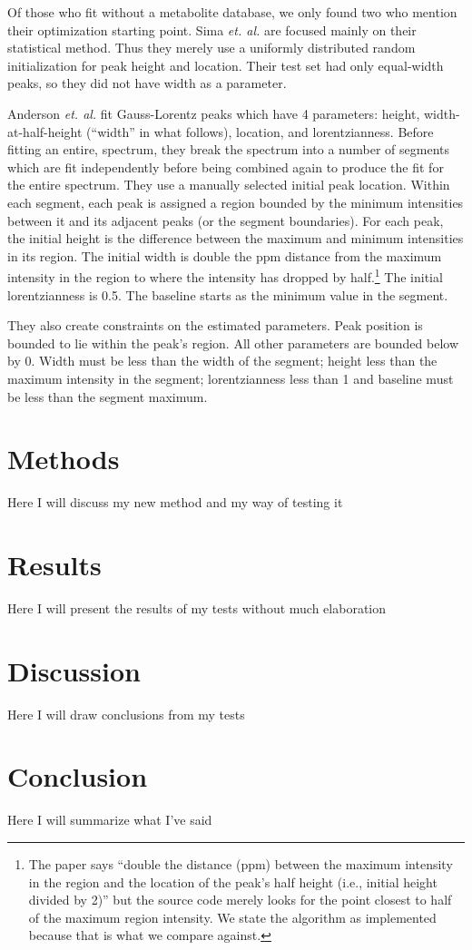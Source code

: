 \documentclass[10pt,letterpaper]{article}
\begin{document}
Of those who fit without a metabolite database, we only found two who mention their optimization starting point.
Sima \textit{et. al.}\cite{Sima2006} are focused mainly on their statistical method. Thus they merely use a 
uniformly distributed random initialization for peak height and location. Their test set had only equal-width
peaks, so they did not have width as a parameter.

Anderson \textit{et. al.}\cite{Anderson2012} fit Gauss-Lorentz peaks which have 4 parameters: height, 
width-at-half-height (``width'' in what follows), location, and lorentzianness. Before fitting an entire, 
spectrum, they break the spectrum into a number of segments which are fit independently before being
combined again to produce the fit for the entire spectrum. They use a manually selected 
initial peak location. Within each segment, each peak is assigned a region bounded by the minimum intensities 
between it and its adjacent peaks (or the segment boundaries). For each peak, the initial height is the 
difference between the maximum and minimum intensities in its region. The initial width is double the ppm 
distance from the maximum intensity in the region to where the intensity has dropped by half.\footnote{
The paper says ``double the distance (ppm) between the maximum intensity in the region and the
location of the peak’s half height (i.e., initial height divided by 2)'' but the source code merely looks for
the point closest to half of the maximum region intensity. We state the algorithm as implemented because that
is what we compare against.} The initial lorentzianness is 0.5. The baseline starts as the minimum value in 
the segment.

They also create constraints on the estimated parameters. Peak position is bounded to lie within the peak's region.
All other parameters are bounded below by 0. Width must be less than the width of the segment; height less
than the maximum intensity in the segment; lorentzianness less than 1 and baseline must be less than the segment
maximum.

\section{Methods}
Here I will discuss my new method and my way of testing it
\section{Results}
Here I will present the results of my tests without much elaboration
\section{Discussion}
Here I will draw conclusions from my tests
\section{Conclusion}
Here I will summarize what I've said



\end{document}
